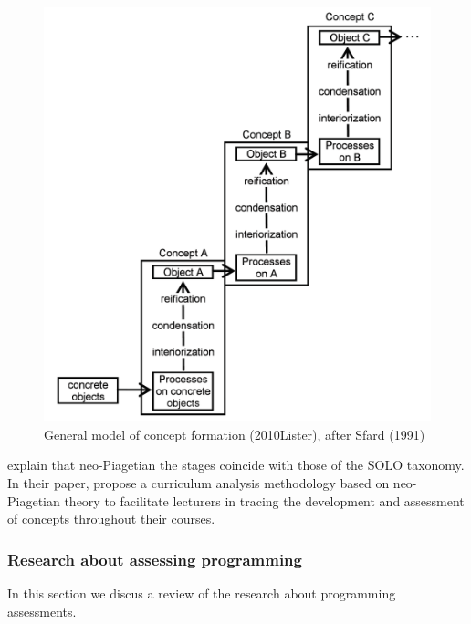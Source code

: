 \begin{figure}
\includegraphics[scale=0.8]{figures/ListerFases.png}
General model of concept formation (2010Lister), after Sfard (1991)
\end{figure}\label{fig:ListerFases}


 explain that neo-Piagetian the stages coincide with those of the SOLO taxonomy. In their paper,  propose a curriculum analysis methodology based on neo-Piagetian theory to facilitate lecturers in tracing the development and assessment of concepts throughout their courses.



\subsubsection{Research about assessing programming}\label{sec:researchAssProgramming}
In this section we discus a review of the research about programming assessments.

